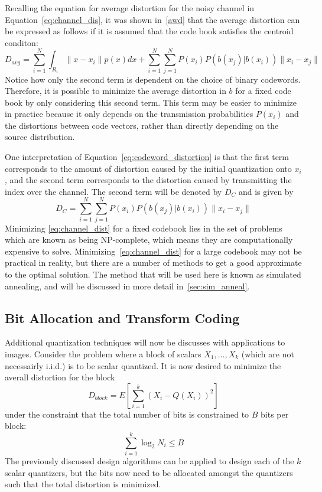 \documentclass[10pt]{article}
\begin{document}
Recalling the equation for average distortion for the noisy channel in Equation~\ref{eq:channel_dis}, it was shown in~\ref{awd} that the average distortion can be expressed as follows if it is assumed that the code book satisfies the centroid conditon:
\begin{equation}
\label{eq:codeword_distortion}
D_{avg}  = \sum_{i=1}^N \int_{R_i} \|x - x_i\|p(x)dx + \sum_{i=1}^N \sum_{j=1}^N P(x_i) P(b(x_j)|b(x_i)) \|x_i - x_j\|
\end{equation}
Notice how only the second term is dependent on the choice of binary codewords. Therefore, it is possible to minimize the average distortion in $b$ for a fixed code book by only considering this second term. This term may be easier to minimize in practice because it only depends on the transmission probabilities $P(x_i)$ and the distortions between code vectors, rather than directly depending on the source distribution.

One interpretation of Equation~\ref{eq:codeword_distortion} is that the first term corresponds to the amount of distortion caused by the initial quantization onto $x_i$, and the second term corresponds to the distortion caused by transmitting the index over the channel. The second term will be denoted by $D_C$ and is given by
\begin{equation}
  \label{eq:channel_dist}
D_C = \sum_{i=1}^N \sum_{j=1}^N P(x_i) P(b(x_j)|b(x_i)) \|x_i - x_j\|
\end{equation}
Minimizing \ref{eq:channel_dist} for a fixed codebook lies in the set of problems which are known as being NP-complete, which means they are computationally expensive to solve. Minimizing~\ref{eq:channel_dist} for a large codebook may not be practical in reality, but there are a number of methods to get a good approximate to the optimal solution. The method that will be used here is known as simulated annealing, and will be discussed in more detail in~\ref{sec:sim_anneal}.

\subsection{Bit Allocation and Transform Coding}
\label{sec:bit_alloc}
Additional quantization techniques will now be discusses with applications to images. Consider the problem where a block of scalars $X_1,\ldots,X_k$ (which are not necessairly i.i.d.) is to be scalar quantized. It is now desired to minimize the averall distortion for the block
\begin{equation}
D_{block} = E[\sum_{i=1}^k(X_i - Q(X_i))^2]
\end{equation}
under the constraint that the total number of bits is constrained to $B$ bits per block:
\begin{equation}
\sum_{i=1}^k \log_2 N_i \le B
\end{equation}
The previously discussed design algorithms can be applied to design each of the $k$ scalar quantizers, but the bits now need to be allocated amongst the quantizers such that the total distortion is minimized.
\end{document}
